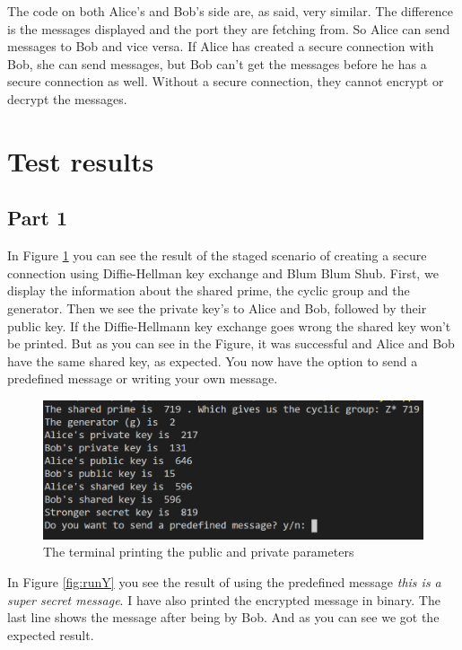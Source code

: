 \documentclass[12pt, letterpaper]{article}
\begin{document}
The code on both Alice's and Bob's side are, as said, very similar. The difference is the messages displayed and the port they are fetching from. So Alice can send messages to Bob and vice versa. If Alice has created a secure connection with Bob, she can send messages, but Bob can't get the messages before he has a secure connection as well. Without a secure connection, they cannot encrypt or decrypt the messages. 

\section*{Test results}

\subsection*{Part 1}
In Figure \ref{fig:runYN} you can see the result of the staged scenario of creating a secure connection using Diffie-Hellman key exchange and Blum Blum Shub. First, we display the information about the shared prime, the cyclic group and the generator. Then we see the private key's to Alice and Bob, followed by their public key. If the Diffie-Hellmann key exchange goes wrong the shared key won't be printed. But as you can see in the Figure, it was successful and Alice and Bob have the same shared key, as expected. You now have the option to send a predefined message or writing your own message.

\begin{figure}[H]
  \includegraphics[width=\linewidth]{code_snippets/runYN.PNG}
  \caption{The terminal printing the public and private parameters}
  \label{fig:runYN}
\end{figure}

In Figure \ref{fig:runY} you see the result of using the predefined message \textit{this is a super secret message}. I have also printed the encrypted message in binary. The last line shows the message after being by Bob. And as you can see we got the expected result.
\end{document}
